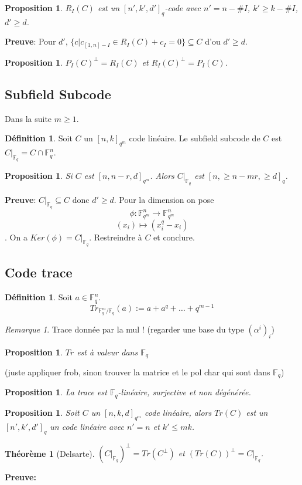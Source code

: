 \documentclass[12pt]{article}
\theoremstyle{plain}
\newtheorem{thm}[subsubsection]{Th\'eor\`eme}
\newtheorem{prop}[subsubsection]{Proposition}
\theoremstyle{definition}
\newtheorem{defn}[subsubsection]{D\'efinition}
\theoremstyle{remark}
\newtheorem{rem}{Remarque}
\newcommand{\F}{\mathbb{F}}
\begin{document}
\begin{prop}
    $R_I(C)$ est un $[n', k', d']_q$-code avec
    $n'=n-\#I$, $k'\geq k-\#I$, $d'\geq d$.
\end{prop}
\textbf{Preuve}: Pour $d'$, $\{c|c_{[1,n]-I}\in R_I(C)+c_I=0\}\subseteq C$ d'ou $d'\geq d$.

\begin{prop}
    $P_I(C)^{\perp}=R_I(C)$ et $R_I(C)^{\perp}=P_I(C)$.
\end{prop}
\subsection{Subfield Subcode}
Dans la suite $m\geq1$. 
\begin{defn}
    Soit $C$ un $[n,k]_{q^m}$ code linéaire. Le subfield subcode de $C$ est 
    $C|_{\F_q}=C\cap \F_q^n$.
\end{defn}
\begin{prop}
    Si $C$ est $[n,n-r,d]_{q^m}$. Alors $C|_{\F_q}$ est $[n,\geq n-mr,\geq d]_q$.
\end{prop}
\textbf{Preuve}: $C|_{\F_q}\subseteq C$ donc $d'\geq d$. Pour la dimension
on pose \[\phi:\F_{q^m}^n\to\F_{q^m}^n\]\[(x_i)\mapsto (x_i^q-x_i)\]. On a 
$Ker(\phi)=C|_{\F_q}$. Restreindre à $C$ et conclure.

\subsection{Code trace}
\begin{defn}
    Soit $a\in \F_q^n$. \[Tr_{\F_q^m/\F_q}(a):= a+a^q+\ldots+q^{m-1}\]
\end{defn}
\begin{rem}
    Trace donnée par la mul ! (regarder une base du type $(\alpha^i)_i$)
\end{rem}

\begin{prop}
    $Tr$ est à valeur dans $\F_q$
\end{prop}
(juste appliquer frob, sinon trouver la matrice et le pol char qui sont dans $\F_q$)

\begin{prop}
    La trace est $\F_q$-linéaire, surjective et non dégénérée.
\end{prop}

\begin{prop}
    Soit $C$ un $[n,k,d]_{q^m}$ code linéaire, alors $Tr(C)$ est un 
    $[n',k',d']_q$ un code linéaire avec $n'=n$ et $k'\leq mk$.
\end{prop}

\begin{thm}[Delsarte]
    $(C|_{\F_q})^{\perp}=Tr(C^{\perp})$ et $(Tr(C))^{\perp}=C|_{\F_q}$.
\end{thm}
\textbf{Preuve:} 
\end{document}
